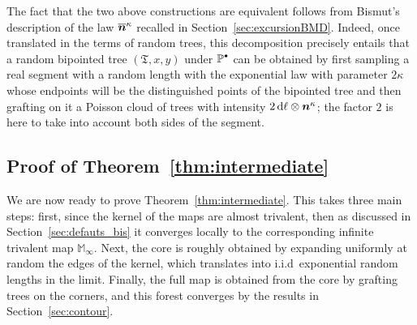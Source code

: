 \documentclass[10pt]{amsart}
\newcommand{\sbullet}{{\raisebox{1pt}{$\scriptscriptstyle\bullet $}}}
\newcommand{\bmn}{\protect\boldsymbol{n}}
\theoremstyle{plain}
\theoremstyle{definition}
\theoremstyle{remark}
\renewcommand{\P}{\mathbb{P}}
\renewcommand{\d}{\mathop{}\!\mathrm{d}}
\newcommand{\Tree}{\mathfrak{T}}
\newcommand{\Mapb}{\mathbb{M}}
\begin{document}
The fact that the two above constructions are equivalent follows from Bismut's description of the law $ \overline{\bmn}^{\kappa}$ recalled in Section~\ref{sec:excursionBMD}. Indeed, once translated in the terms of random trees, this decomposition precisely entails that a random bipointed tree $(\Tree,x,y)$ under $\P^{\sbullet}$ can be obtained by first sampling a real segment with a random length with the exponential law with parameter $2 \kappa$ whose endpoints will be the distinguished points of the bipointed tree and then grafting on it a Poisson cloud of trees with intensity $ 2\d \ell \otimes \bmn^{\kappa}$; the factor $2$ is here to take into account both sides of the segment.

\subsection{Proof of Theorem~\ref{thm:intermediate}}

We are now ready to prove Theorem~\ref{thm:intermediate}. This takes three main steps: first, since the kernel of the maps are almost trivalent, then as discussed in Section~\ref{sec:defauts_bis} it converges locally to the corresponding infinite trivalent map $\Mapb_\infty$. Next, the core is roughly obtained by expanding uniformly at random the edges of the kernel, which translates into i.i.d~exponential random lengths in the limit. Finally, the full map is obtained from the core by grafting trees on the corners, and this forest converges by the results in Section~\ref{sec:contour}.
\end{document}
